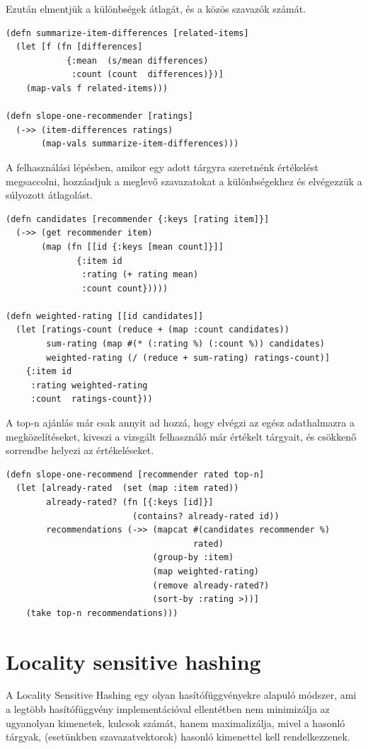 \documentclass[final, 12pt] {ubb_dolgozat}{book}
\begin{document}
Ezután elmentjük a különbségek átlagát, és a közös szavazók számát.

\begin{verbatim}
(defn summarize-item-differences [related-items]
  (let [f (fn [differences]
            {:mean  (s/mean differences)
             :count (count  differences)})]
    (map-vals f related-items)))

(defn slope-one-recommender [ratings]
  (->> (item-differences ratings)
       (map-vals summarize-item-differences)))
\end{verbatim}

A felhasználási lépésben, amikor egy adott tárgyra szeretnénk értékelést megsaccolni,
hozzáadjuk a meglevő szavazatokat a különbségekhez és elvégezzük a súlyozott átlagolást.

\begin{verbatim}
(defn candidates [recommender {:keys [rating item]}]
  (->> (get recommender item)
       (map (fn [[id {:keys [mean count]}]]
              {:item id
               :rating (+ rating mean)
               :count count}))))

(defn weighted-rating [[id candidates]]
  (let [ratings-count (reduce + (map :count candidates))
        sum-rating (map #(* (:rating %) (:count %)) candidates)
        weighted-rating (/ (reduce + sum-rating) ratings-count)]
    {:item id
     :rating weighted-rating
     :count  ratings-count}))
\end{verbatim}

A top-n ajánlás már csak annyit ad hozzá, hogy elvégzi az egész adathalmazra a
megközelítéseket, kiveszi a vizsgált felhasználó már értékelt tárgyait, és csökkenő sorrendbe helyezi az értékeléseket.

\begin{verbatim}
(defn slope-one-recommend [recommender rated top-n]
  (let [already-rated  (set (map :item rated))
        already-rated? (fn [{:keys [id]}]
                         (contains? already-rated id))
        recommendations (->> (mapcat #(candidates recommender %)
                                     rated)
                             (group-by :item)
                             (map weighted-rating)
                             (remove already-rated?)
                             (sort-by :rating >))]
    (take top-n recommendations)))
\end{verbatim}

\section{Locality sensitive hashing}
\label{sec:org9a38e36}
A Locality Sensitive Hashing egy olyan hasítófüggvényekre alapuló módszer, ami a legtöbb hasítófüggvény implementációval ellentétben nem minimizálja az ugyanolyan kimenetek, kulcsok
számát, hanem maximalizálja, mivel a hasonló tárgyak, (esetünkben szavazatvektorok) hasonló kimenettel kell rendelkezzenek.
\end{document}
